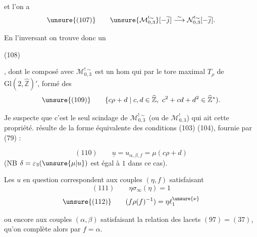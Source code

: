 
et l'on a
\[
 \unsure{(107)}\qquad
 \unsure{\mathcal M_{0,3}^{!\sim}}[-\overline{j}]
 \overset{\sim}{\longrightarrow}
 \mathcal N_{0,3}^{!\sim}[-\overline{j}].
\]

En l'inversant on trouve donc un

\begin{samepage}
(108)
\end{samepage}
,
dont le composé avec $\mathcal M_{0,3}^{!\sim}$ est un hom qui
par le tore maximal $T_\rho$ de $\mathrm{Gl}(2,\widehat{\mathbb Z})'$,
formé des
\[
 \unsure{(109)}\qquad
 \{c\rho+d\mid c,d\in\widehat{\mathbb Z},\
 c^2+cd+d^2\in\widehat{\mathbb Z}^{*}).
\]

Je suspecte que c'est le seul scindage de
$\mathcal M_{0,3}^{!\sim}$
(ou  de $\mathcal M_{0,3}^{!}$)
qui ait cette propriété.  résulte de la forme équivalente
des conditions (103) (104), fournie par (79) :



\[
 (110)\qquad
 \underline{u}=u_{\alpha,\beta,f}=\mu(c\rho+d)
\]
(NB $\delta=\varepsilon_3(\unsure{\mu|u})$ est égal à $1$ dans ce cas).

Les $u$ en question correspondent aux couples $(\eta,f)$ satisfaisant
\[
 (111)\qquad \eta\sigma_\infty(\eta)=1
\]
\[
 \unsure{(112)}\qquad
 (f\rho(f)^{-1})=\eta\ell_1^{\unsure{\nu}}
\]



ou encore aux couples $(\alpha,\beta)$ satisfaisant la relation des lacets
$(97)=(37)$, qu'on complète alors par $f=\alpha$.

